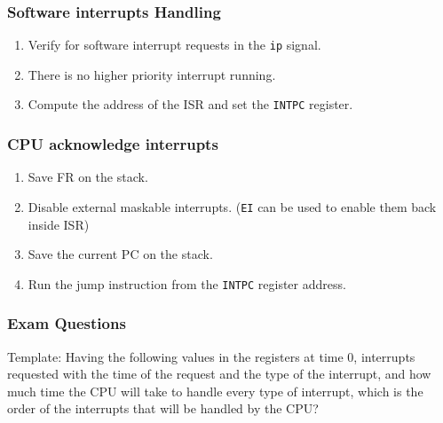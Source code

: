 \begin{frame}
    \frametitle{Software interrupts Handling}
    \begin{enumerate}
        \item Verify for software interrupt requests in the \texttt{ip} signal.
        \item There is no higher priority interrupt running.
        \item Compute the address of the ISR and set the \texttt{INTPC} register.
    \end{enumerate}
\end{frame}

\begin{frame}
    \frametitle{CPU acknowledge interrupts}
    \begin{enumerate}
        \item Save FR on the stack.
        \item Disable external maskable interrupts. (\texttt{EI} can be used to enable them back inside ISR)
        \item Save the current PC on the stack.
        \item Run the jump instruction from the \texttt{INTPC} register address.
    \end{enumerate}
\end{frame}

\begin{frame}
    \frametitle{Exam Questions}
    Template: Having the following values in the registers at time 0,
    interrupts requested with the time of the request and the type of the interrupt,
    and how much time the CPU will take to handle every type of interrupt,
    which is the order of the interrupts that will be handled by the CPU?
\end{frame}


